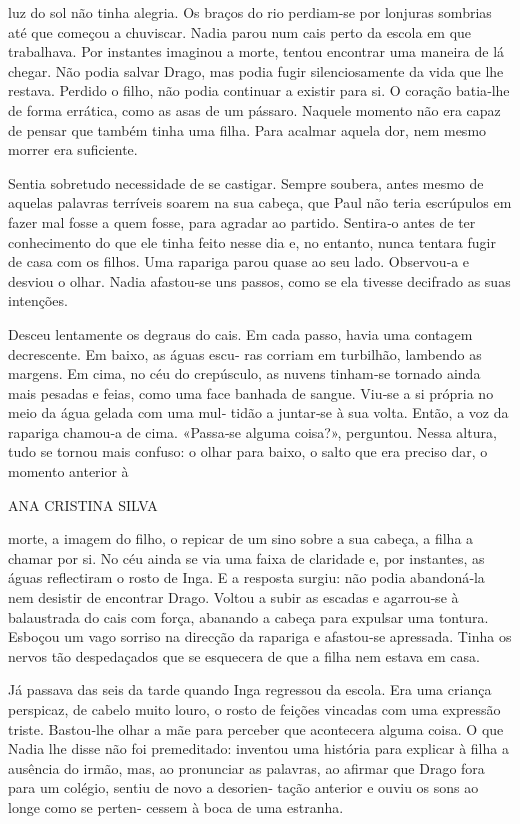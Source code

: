 luz do sol não tinha alegria. Os braços do rio perdiam‑se por lonjuras
sombrias até que começou a chuviscar. Nadia parou num cais perto da
escola em que trabalhava. Por instantes imaginou a morte, tentou
encontrar uma maneira de lá chegar. Não podia salvar Drago, mas podia
fugir silenciosamente da vida que lhe restava. Perdido o filho, não
podia continuar a existir para si. O coração batia‑lhe de forma
errática, como as asas de um pássaro. Naquele momento não era capaz de
pensar que também tinha uma filha. Para acalmar aquela dor, nem mesmo
morrer era suficiente.

Sentia sobretudo necessidade de se castigar. Sempre soubera, antes mesmo
de aquelas palavras terríveis soarem na sua cabeça, que Paul não teria
escrúpulos em fazer mal fosse a quem fosse, para agradar ao partido.
Sentira‑o antes de ter conhecimento do que ele tinha feito nesse dia e,
no entanto, nunca tentara fugir de casa com os filhos. Uma rapariga
parou quase ao seu lado. Observou‑a e desviou o olhar. Nadia afastou‑se
uns passos, como se ela tivesse decifrado as suas intenções.

Desceu lentamente os degraus do cais. Em cada passo, havia uma contagem
decrescente. Em baixo, as águas escu‑ ras corriam em turbilhão, lambendo
as margens. Em cima, no céu do crepúsculo, as nuvens tinham‑se tornado
ainda mais pesadas e feias, como uma face banhada de sangue. Viu‑se a si
própria no meio da água gelada com uma mul‑ tidão a juntar‑se à sua
volta. Então, a voz da rapariga chamou‑a de cima. «Passa‑se alguma
coisa?», perguntou. Nessa altura, tudo se tornou mais confuso: o olhar
para baixo, o salto que era preciso dar, o momento anterior à

ANA CRISTINA SILVA

morte, a imagem do filho, o repicar de um sino sobre a sua cabeça, a
filha a chamar por si. No céu ainda se via uma faixa de claridade e, por
instantes, as águas reflectiram o rosto de Inga. E a resposta surgiu:
não podia abandoná‑la nem desistir de encontrar Drago. Voltou a subir as
escadas e agarrou‑se à balaustrada do cais com força, abanando a cabeça
para expulsar uma tontura. Esboçou um vago sorriso na direcção da
rapariga e afastou‑se apressada. Tinha os nervos tão despedaçados que se
esquecera de que a filha nem estava em casa.

Já passava das seis da tarde quando Inga regressou da escola. Era uma
criança perspicaz, de cabelo muito louro, o rosto de feições vincadas
com uma expressão triste. Bastou‑lhe olhar a mãe para perceber que
acontecera alguma coisa. O que Nadia lhe disse não foi premeditado:
inventou uma história para explicar à filha a ausência do irmão, mas, ao
pronunciar as palavras, ao afirmar que Drago fora para um colégio,
sentiu de novo a desorien‑ tação anterior e ouviu os sons ao longe como
se perten‑ cessem à boca de uma estranha.

